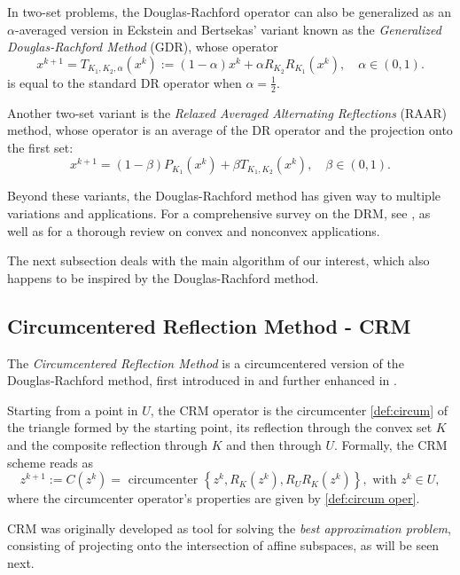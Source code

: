 \documentclass[smallextended,numbook,nospthms]{svjour3}
\theoremstyle{plain}
\theoremstyle{definition}
\begin{document}
In two-set problems, the Douglas-Rachford operator can also be generalized as an $\alpha$-averaged version in Eckstein and Bertsekas' \cite{Eckstein:1992} variant known as the \emph{Generalized Douglas-Rachford Method} (GDR), whose operator
$$
x^{k+1}=T_{K_1, K_2, \alpha}\left(x^{k}\right):=(1-\alpha) x^{k}+\alpha R_{K_2} R_{K_1}\left(x^{k}\right), \quad \alpha \in (0,1).
$$
is equal to the standard DR operator when $\alpha=\frac{1}{2}$.

Another two-set variant is the \emph{Relaxed Averaged Alternating Reflections} (RAAR) \cite{Luke:2005} method, whose operator is an average of the DR operator and the projection onto the first set:
$$
x^{k+1}=(1-\beta) P_{K_1}\left(x^{k}\right)+\beta T_{K_1, K_2}\left(x^{k}\right), \quad \beta \in (0,1).
$$

Beyond these variants, the Douglas-Rachford method has given way to multiple variations and applications. For a comprehensive survey on the DRM, see \cite{Lindstrom:2018uc}, as well as \cite{AragonArtacho:2019ug} for a thorough review on convex and nonconvex applications.

The next subsection deals with the main algorithm of our interest, which also happens to be inspired by the Douglas-Rachford method.

\newpage
\subsection{Circumcentered Reflection Method - CRM}\label{subsec:CRM}

The \emph{Circumcentered Reflection Method} is a circumcentered version of the Douglas-Rachford method, first introduced in \cite{Behling:2018a,Behling:2018} and further enhanced in \cite{Arefidamghani:2020,Bauschke:2018ut,Bauschke:2018wa, Bauschke:2019uh,Bauschke:2020a,Behling:2019dj,Behling:2020,Dizon:2019vq,Dizon:2020a,Ouyang:2018gu,Lindstrom:2020a}.

Starting from a point in $U$, the CRM operator is the circumcenter \cref{def:circum} of the triangle formed by the starting point, its reflection through the convex set $K$ and the composite reflection through $K$ and then through $U$. Formally, the CRM scheme reads as
\[
z^{k+1}:=C\left(z^{k}\right)=\text { circumcenter }\left\{z^{k}, R_{K}\left(z^{k}\right), R_{U} R_{K}\left(z^{k}\right)\right\}, \text { with } z^{k} \in U \label{eq:CRM},
\]
where the circumcenter operator's properties are given by \cref{def:circum oper}.

CRM was originally developed as tool for solving the \emph{best approximation problem}, consisting of projecting onto the intersection of affine subspaces, as will be seen next.
\end{document}
